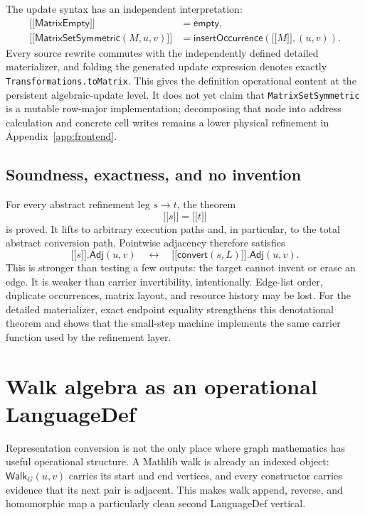 \documentclass[11pt]{article}
\theoremstyle{remark}
\newcommand{\code}[1]{\texttt{#1}}
\newcommand{\denote}[1]{\mathopen{[\![}#1\mathclose{]\!]}}
\newcommand{\Step}{\mathrel{\longrightarrow}}
\begin{document}
The update syntax has an independent interpretation:
\[
\begin{aligned}
\denote{\mathsf{MatrixEmpty}}&=\mathsf{empty},\\
\denote{\mathsf{MatrixSetSymmetric}(M,u,v)}
  &=\mathsf{insertOccurrence}(\denote{M},(u,v)).
\end{aligned}
\]
Every source rewrite commutes with the independently defined detailed
materializer, and folding the generated update expression denotes exactly
\code{Transformations.toMatrix}.  This gives the definition operational
content at the persistent algebraic-update level.  It does not yet claim that
\code{MatrixSetSymmetric} is a mutable row-major implementation; decomposing
that node into address calculation and concrete cell writes remains a lower
physical refinement in Appendix~\ref{app:frontend}.

\subsection{Soundness, exactness, and no invention}

For every abstract refinement leg \(s\Step t\), the theorem
\[
  \denote{s}=\denote{t}
\]
is proved.  It lifts to arbitrary execution paths and, in particular, to the
total abstract conversion path.  Pointwise adjacency therefore satisfies
\[
  \denote{s}.\mathsf{Adj}(u,v)
  \quad\longleftrightarrow\quad
  \denote{\mathsf{convert}(s,L)}.\mathsf{Adj}(u,v).
\]
This is stronger than testing a few outputs: the target cannot invent or erase
an edge.  It is weaker than carrier invertibility, intentionally.  Edge-list
order, duplicate occurrences, matrix layout, and resource history may be lost.
For the detailed materializer, exact endpoint equality strengthens this
denotational theorem and shows that the small-step machine implements the same
carrier function used by the refinement layer.

\section{Walk algebra as an operational LanguageDef}
\label{sec:walk-langdef}

Representation conversion is not the only place where graph mathematics has
useful operational structure.  A Mathlib walk is already an indexed object:
\(\mathsf{Walk}_G(u,v)\) carries its start and end vertices, and every
constructor carries evidence that its next pair is adjacent.  This makes
walk append, reverse, and homomorphic map a particularly clean second
LanguageDef vertical.
\end{document}
